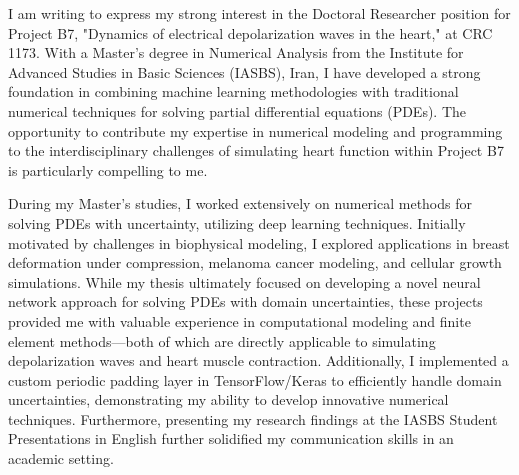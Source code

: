 \documentclass[10pt,stdletter,dateno]{newlfm}
\begin{document}
	\begin{newlfm}
		
		I am writing to express my strong interest in the Doctoral Researcher position for Project B7, "Dynamics of electrical depolarization waves in the heart," at CRC 1173. With a Master's degree in Numerical Analysis from the Institute for Advanced Studies in Basic Sciences (IASBS), Iran, I have developed a strong foundation in combining machine learning methodologies with traditional numerical techniques for solving partial differential equations (PDEs).  The opportunity to contribute my expertise in numerical modeling and programming to the interdisciplinary challenges of simulating heart function within Project B7 is particularly compelling to me.
		

		During my Master’s studies, I worked extensively on numerical methods for solving PDEs with uncertainty, utilizing deep learning techniques. Initially motivated by challenges in biophysical modeling, I explored applications in breast deformation under compression, melanoma cancer modeling, and cellular growth simulations. While my thesis ultimately focused on developing a novel neural network approach for solving PDEs with domain uncertainties, these projects provided me with valuable experience in computational modeling and finite element methods—both of which are directly applicable to simulating depolarization waves and heart muscle contraction. Additionally, I implemented a custom periodic padding layer in TensorFlow/Keras to efficiently handle domain uncertainties, demonstrating my ability to develop innovative numerical techniques. Furthermore, presenting my research findings at the IASBS Student Presentations in English further solidified my communication skills in an academic setting. 
		

\end{newlfm}
\end{document}
